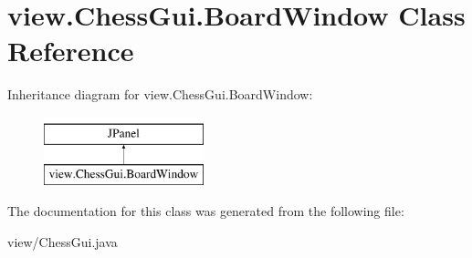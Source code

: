 \hypertarget{classview_1_1ChessGui_1_1BoardWindow}{\section{view.\-Chess\-Gui.\-Board\-Window Class Reference}
\label{classview_1_1ChessGui_1_1BoardWindow}
}
Inheritance diagram for view.\-Chess\-Gui.\-Board\-Window\-:\begin{figure}[H]
\begin{center}
\leavevmode
\includegraphics[height=2.000000cm]{classview_1_1ChessGui_1_1BoardWindow}
\end{center}
\end{figure}


The documentation for this class was generated from the following file\-:\begin{DoxyCompactItemize}
\item 
view/Chess\-Gui.\-java\end{DoxyCompactItemize}
